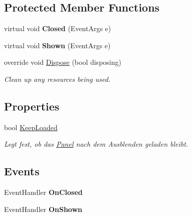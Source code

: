 \subsection*{Protected Member Functions}
\begin{DoxyCompactItemize}
\item 
virtual void {\bfseries Closed} (Event\+Args e)\hypertarget{class_products_1_1_common_1_1_panel_1_1pnl_slider_adf067d875fb2b1069cb2d80e9d9812d0}{}\label{class_products_1_1_common_1_1_panel_1_1pnl_slider_adf067d875fb2b1069cb2d80e9d9812d0}

\item 
virtual void {\bfseries Shown} (Event\+Args e)\hypertarget{class_products_1_1_common_1_1_panel_1_1pnl_slider_a06fb7f5f2205f3eb64d45f5deef79fbd}{}\label{class_products_1_1_common_1_1_panel_1_1pnl_slider_a06fb7f5f2205f3eb64d45f5deef79fbd}

\item 
override void \hyperlink{class_products_1_1_common_1_1_panel_1_1pnl_slider_afd645533af48fad7d09bf7e0fae70a77}{Dispose} (bool disposing)
\begin{DoxyCompactList}\small\item\em Clean up any resources being used. \end{DoxyCompactList}\end{DoxyCompactItemize}
\subsection*{Properties}
\begin{DoxyCompactItemize}
\item 
bool \hyperlink{class_products_1_1_common_1_1_panel_1_1pnl_slider_aaccd0a0fe4d8379035f9cbb58ddc4c70}{Keep\+Loaded}
\begin{DoxyCompactList}\small\item\em Legt fest, ob das \hyperlink{namespace_products_1_1_common_1_1_panel}{Panel} nach dem Ausblenden geladen bleibt. \end{DoxyCompactList}\end{DoxyCompactItemize}
\subsection*{Events}
\begin{DoxyCompactItemize}
\item 
Event\+Handler {\bfseries On\+Closed}\hypertarget{class_products_1_1_common_1_1_panel_1_1pnl_slider_aeb76c295cca792692be45c8c8439638d}{}\label{class_products_1_1_common_1_1_panel_1_1pnl_slider_aeb76c295cca792692be45c8c8439638d}

\item 
Event\+Handler {\bfseries On\+Shown}\hypertarget{class_products_1_1_common_1_1_panel_1_1pnl_slider_aaefe6301be67e7b18af2da5e1d1a7a34}{}\label{class_products_1_1_common_1_1_panel_1_1pnl_slider_aaefe6301be67e7b18af2da5e1d1a7a34}

\end{DoxyCompactItemize}



